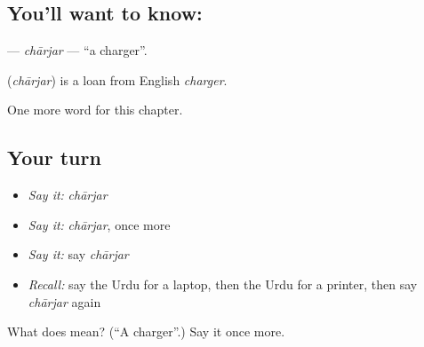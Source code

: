 \subsection*{You'll want to know: }
\textbf{} — \emph{chārjar} — \textquotedblleft{}a charger\textquotedblright{}.

\begin{cousinweb}
\textbf{} (\emph{chārjar}) is a loan from English \emph{charger}.
\end{cousinweb}

\begin{grammarlens}[title={What you've built}]
One more word for this chapter.
\end{grammarlens}

\subsection*{Your turn}
\begin{itemize}
\raggedright
  \item \emph{Say it:} \emph{chārjar}
  \item \emph{Say it:} \emph{chārjar}, once more
  \item \emph{Say it:} say \emph{chārjar}
  \item \emph{Recall:} say the Urdu for a laptop, then the Urdu for a printer, then say \emph{chārjar} again
\end{itemize}

\begin{tcolorbox}[breakable,colback=teal!4,colframe=teal!35!black,title={Before you move on}]
What does  mean? (\textquotedblleft{}A charger\textquotedblright{}.) Say it once more.
\end{tcolorbox}
